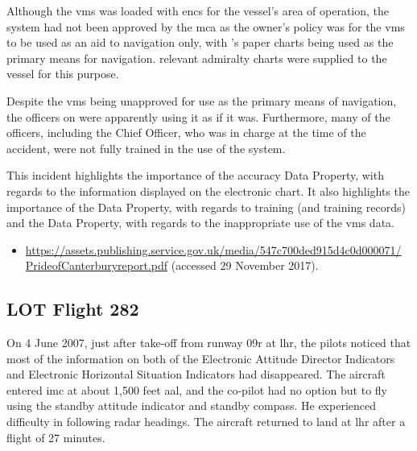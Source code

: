 Although the \gls{vms} was loaded with \glspl{enc} for the vessel's area of operation, the system had not been approved by the \gls{mca} as the owner's policy was for the \gls{vms} to be used as an aid to navigation only, with 's paper charts being used as the primary means for navigation. relevant admiralty charts were supplied to the vessel for this purpose.

Despite the \gls{vms} being unapproved for use as the primary means of navigation, the officers on  were apparently using it as if it was. Furthermore, many of the officers, including the Chief Officer, who was in charge at the time of the accident, were not fully trained in the use of the system.

This incident highlights the importance of the \gls{accuracy} Data Property, with regards to the \gls{information} displayed on the electronic chart. It also highlights the importance of the  Data Property, with regards to training (and training records) and the  Data Property, with regards to the inappropriate use of the \gls{vms} data.

\begin{samepage}
\begin{itemize}
  \item \raggedright{\href{https://assets.publishing.service.gov.uk/media/547c700ded915d4c0d000071/PrideofCanterburyreport.pdf}{https://assets.publishing.service.gov.uk/media/547c700ded915d4c0d000071/ PrideofCanterburyreport.pdf} (accessed 29 November 2017).}
\end{itemize}
\end{samepage}


\subsection{LOT Flight 282} \label{bkm:incacc:lot282}
On 4 June 2007, just after take-off from runway 09r at \gls{lhr}, the pilots noticed that most of the \gls{information} on both of the Electronic Attitude Director Indicators and Electronic Horizontal Situation Indicators had disappeared. The aircraft entered \gls{imc} at about 1,500 feet \gls{aal}, and the co-pilot had no option but to fly using the standby attitude indicator and standby compass. He experienced difficulty in following radar headings. The aircraft returned to land at \gls{lhr} after a flight of 27 minutes.


